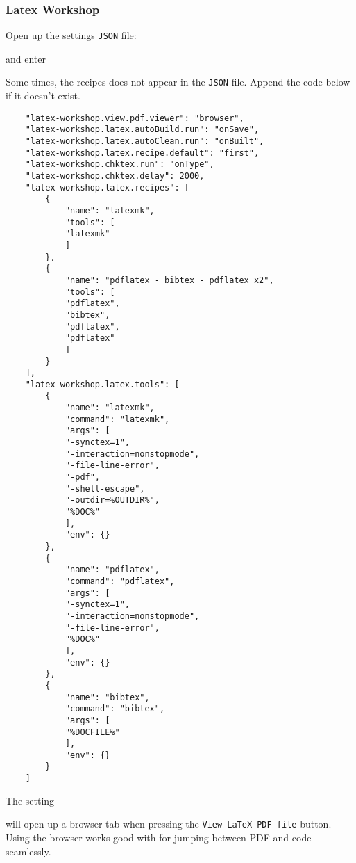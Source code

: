 \subsubsection{Latex Workshop}

Open up the settings \texttt{JSON} file:

 and enter


Some times, the recipes does not appear in the \texttt{JSON} file. Append the code below if it doesn't exist. 


\begin{verbatim}
    "latex-workshop.view.pdf.viewer": "browser",
    "latex-workshop.latex.autoBuild.run": "onSave",
    "latex-workshop.latex.autoClean.run": "onBuilt",
    "latex-workshop.latex.recipe.default": "first",
    "latex-workshop.chktex.run": "onType",
    "latex-workshop.chktex.delay": 2000,
    "latex-workshop.latex.recipes": [
        {
            "name": "latexmk",
            "tools": [
            "latexmk"
            ]
        },
        {
            "name": "pdflatex - bibtex - pdflatex x2",
            "tools": [
            "pdflatex",
            "bibtex",
            "pdflatex",
            "pdflatex"
            ]
        }
    ],
    "latex-workshop.latex.tools": [
        {
            "name": "latexmk",
            "command": "latexmk",
            "args": [
            "-synctex=1",
            "-interaction=nonstopmode",
            "-file-line-error",
            "-pdf",
            "-shell-escape",
            "-outdir=%OUTDIR%",
            "%DOC%"
            ],
            "env": {}
        },
        {
            "name": "pdflatex",
            "command": "pdflatex",
            "args": [
            "-synctex=1",
            "-interaction=nonstopmode",
            "-file-line-error",
            "%DOC%"
            ],
            "env": {}
        },
        {
            "name": "bibtex",
            "command": "bibtex",
            "args": [
            "%DOCFILE%"
            ],
            "env": {}
        }
    ]
    \end{verbatim}


The setting


will open up a browser tab when pressing the \texttt{View LaTeX PDF file} button. Using the browser works good with  for jumping between PDF and code seamlessly.

